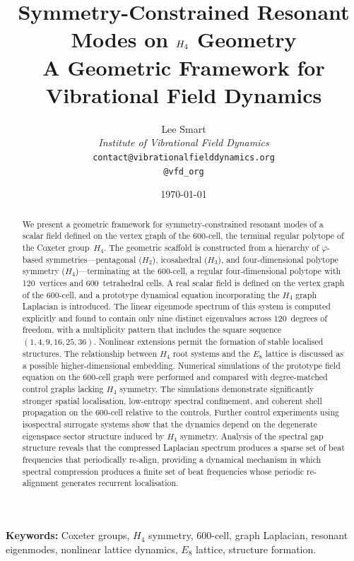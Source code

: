 \documentclass[12pt,a4paper]{article}
\title{%
  \textbf{Symmetry-Constrained Resonant Modes on $\Hfour$ Geometry}\\[6pt]
  \large A Geometric Framework for Vibrational Field Dynamics%
}
\author{%
  Lee Smart\\[4pt]
  \textit{Institute of Vibrational Field Dynamics}\\[2pt]
  \texttt{contact@vibrationalfielddynamics.org}\\[2pt]
  \texttt{@vfd\_org}%
}
\date{\today}
\newcommand{\Hfour}{H_4}
\newcommand{\Hthree}{H_3}
\newcommand{\Htwo}{H_2}
\newcommand{\Eeight}{E_8}
\newcommand{\vphi}{\varphi}
\begin{document}
\maketitle
\thispagestyle{empty}

\begin{abstract}
We present a geometric framework for symmetry-constrained resonant modes
of a scalar field defined on the vertex graph of the 600-cell, the terminal
regular polytope of the Coxeter group~$\Hfour$.  The geometric scaffold is constructed from a hierarchy of
$\vphi$-based symmetries---pentagonal ($\Htwo$), icosahedral ($\Hthree$), and
four-dimensional polytope symmetry ($\Hfour$)---terminating at the 600-cell,
a regular four-dimensional polytope with 120~vertices and 600~tetrahedral
cells.  A real scalar field is defined on the vertex graph of the 600-cell,
and a prototype dynamical equation incorporating the $\Hfour$ graph Laplacian
is introduced.  The linear eigenmode spectrum of this system is computed explicitly and found
to contain only nine distinct eigenvalues across 120~degrees of freedom, with
a multiplicity pattern that includes the square sequence
$(1,4,9,16,25,36)$.  Nonlinear extensions permit the formation of stable
localised structures.  The
relationship between $\Hfour$ root systems and the $\Eeight$ lattice is
discussed as a possible higher-dimensional embedding.
Numerical simulations of the prototype field equation on the
600-cell graph were performed and compared with degree-matched
control graphs lacking $\Hfour$ symmetry.  The simulations
demonstrate significantly stronger spatial localisation,
low-entropy spectral confinement, and coherent shell
propagation on the 600-cell relative to the controls.
Further control experiments using isospectral surrogate
systems show that the dynamics depend on the degenerate
eigenspace sector structure induced by $\Hfour$ symmetry.
Analysis of the spectral gap structure reveals that the
compressed Laplacian spectrum produces a sparse set of beat
frequencies that periodically re-align, providing a dynamical mechanism in which spectral compression
produces a finite set of beat frequencies whose periodic
re-alignment generates recurrent localisation.
\end{abstract}

\vspace{1em}
\noindent\textbf{Keywords:}
Coxeter groups, $\Hfour$ symmetry, 600-cell, graph Laplacian,
resonant eigenmodes, nonlinear lattice dynamics, $\Eeight$ lattice,
structure formation.
\end{document}
